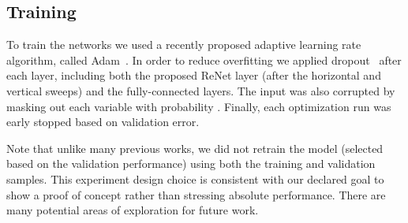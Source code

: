 \documentclass{article} \usepackage{nips15submit_e,times}
\begin{document}
\subsection{Training}

To train the networks we used a recently proposed adaptive learning rate 
algorithm, called Adam~\citep{Kingma2014}. In order to reduce overfitting we 
applied dropout~\citep{Srivastava14} after each layer, including both the 
proposed ReNet layer (after the horizontal and vertical sweeps) and the 
fully-connected layers. The input was also corrupted by masking out each variable 
with probability . Finally, each optimization run was early stopped based 
on validation error.

Note that unlike many previous works, we did not retrain the model (selected
based on the validation performance) using both the training and validation
samples. This experiment design choice is consistent with our declared goal to
show a proof of concept rather than stressing absolute performance. There are
many potential areas of exploration for future work.
\end{document}
